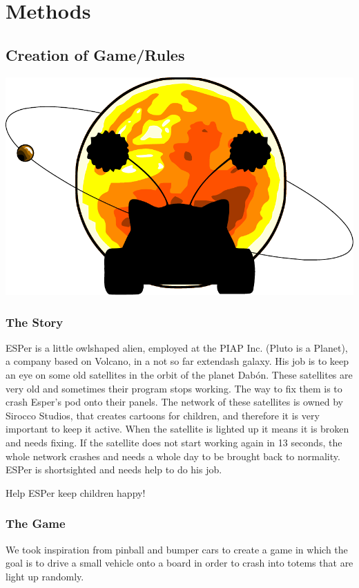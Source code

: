 \documentclass[a4paper,twoside]{book}
\begin{document}
\chapter{Methods}

\section{Creation of Game/Rules}

\includegraphics[width=\textwidth]{img/logo_finito}
\subsection{The Story}

ESPer is a little owl\textendash shaped alien, employed at the PIAP Inc. (Pluto is a Planet), a company based on Volcano, in a not so far extendash galaxy. His job is to keep an eye on some old satellites in the orbit of the planet Dab\'{o}n. These satellites are very old and sometimes their program stops working. The way to fix them is to crash Esper's pod onto their panels. The network of these satellites is owned by Sirocco Studios, that creates cartoons for children, and therefore it is very important to keep it active. When the satellite is lighted up it means it is broken and needs fixing. If the satellite does not start working again in 13 seconds, the whole network crashes and needs a whole day to be brought back to normality. ESPer is short\textendash sighted and needs help to do his job.

Help ESPer keep children happy!

\subsection{The Game}
We took inspiration from pinball and bumper cars to create a game in which the goal is to drive a small vehicle onto a board in order to crash into totems that are light up randomly.
\end{document}
